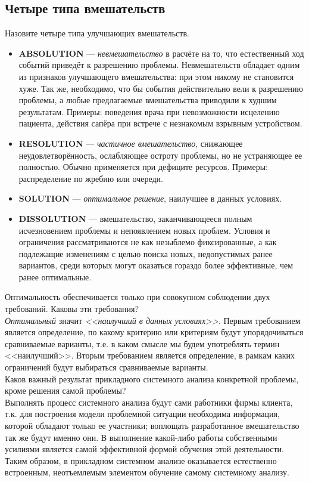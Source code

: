 \documentclass{article}
\newcommand{\note}[1]{\textit{#1}}
\newcommand{\important}[1]{\textbf{#1}}
\begin{document}
\subsection*{Четыре типа вмешательств}
Назовите четыре типа улучшающих вмешательств.
\begin{itemize}
	\item \important{ABSOLUTION} --- \note{невмешательство} в расчёте на то, что естественный ход событий приведёт к разрешению проблемы. Невмешательств обладает одним из признаков улучшающего вмешательства: при этом никому не становится хуже. Так же, необходимо, что бы события действительно вели к разрешению проблемы, а любые предлагаемые вмешательства приводили к худшим результатам. Примеры: поведения врача при невозможности исцелению пациента, действия сапёра при встрече с незнакомым взрывным устройством.
	\item \important{RESOLUTION} --- \note{частичное вмешательство}, снижающее неудовлетворённость, ослабляющее остроту проблемы, но не устраняющее ее полностью. Обычно применяется при дефиците ресурсов. Примеры: распределение по жребию или очереди.
	\item \important{SOLUTION} --- \note{оптимальное решение}, наилучшее в данных условиях. 
	\item \important{DISSOLUTION} --- вмешательство, заканчивающееся полным исчезновением проблемы и непоявлением новых проблем. Условия и ограничения рассматриваются не как незыблемо фиксированные, а как подлежащие изменениям с целью поиска новых, недопустимых ранее вариантов, среди которых могут оказаться гораздо более эффективные, чем ранее оптимальные.
\end{itemize}
Оптимальность обеспечивается только при совокупном соблюдении двух требований. Каковы эти требования?
\\
\note{Оптимальный} значит \note{<<наилучший в данных условиях>>}. Первым требованием является определение, по какому критерию или критериям будут упорядочиваться сравниваемые варианты, т.е. в каком смысле мы будем употреблять термин <<наилучший>>. Вторым требованием является определение, в рамкам каких ограничений будут выбираться сравниваемые варианты.
\\
Каков важный результат прикладного системного анализа конкретной проблемы, кроме решения самой проблемы?
\\
Выполнять процесс системного анализа будут сами работники фирмы клиента, т.к. для построения модели проблемной ситуации необходима информация, которой обладают только ее участники; воплощать разработанное вмешательство так же будут именно они. В выполнение какой-либо работы собственными усилиями является самой эффективной формой обучения этой деятельности. Таким образом, в прикладном системном анализе оказывается естественно встроенным, неотъемлемым элементом обучение самому системному анализу.
\end{document}
